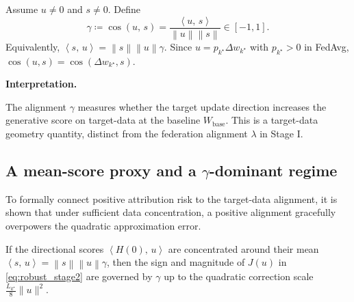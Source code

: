 \documentclass[bdcc,article,submit,pdftex]{Definitions/mdpi}
\newcommand{\ip}[2]{\left\langle #1,\,#2 \right\rangle}
\newcommand{\norm}[1]{\left\lVert #1 \right\rVert}
\newcommand{\tindex}{k^\star}
\newcommand{\utarget}{u}
\renewcommand{\paragraph}[1]{\medskip\noindent\textbf{#1}\par\nobreak}
\begin{document}
\begin{Definition}
\label{def:gamma}
Assume $\utarget\neq 0$ and $s\neq 0$. Define
\begin{equation}
\label{eq:gamma}
\gamma \coloneqq \cos(\utarget,\,s)=\frac{\ip{\utarget}{s}}{\norm{\utarget}\norm{s}}\in[-1,1].
\end{equation}
Equivalently, $\ip{s}{\utarget}=\norm{s}\norm{\utarget}\gamma$.
Since $\utarget=p_{\tindex}\Delta w_{\tindex}$ with $p_{\tindex}>0$ in FedAvg, $\cos(\utarget,s)=\cos(\Delta w_{\tindex},s)$.
\end{Definition}

\paragraph{Interpretation.}
The alignment $\gamma$ measures whether the target update direction increases the generative score on target-data at the baseline $W_{\mathrm{base}}$.
This is a target-data geometry quantity, distinct from the federation alignment $\lambda$ in Stage I.

\subsection{A mean-score proxy and a \texorpdfstring{$\gamma$}{gamma}-dominant regime}

To formally connect positive attribution risk to the target-data alignment, it is shown that under sufficient data concentration, a positive alignment gracefully overpowers the quadratic approximation error.

\begin{Lemma}
\label{prop:mean_proxy}
If the directional scores $\ip{H(0)}{\utarget}$ are concentrated around their mean $\ip{s}{\utarget}=\norm{s}\norm{\utarget}\gamma$, then
the sign and magnitude of $J(\utarget)$ in \eqref{eq:robust_stage2} are governed by $\gamma$ up to the quadratic correction scale
$\frac{L_{\tindex}}{8}\|\utarget\|^2$.
\end{Lemma}
\end{document}
